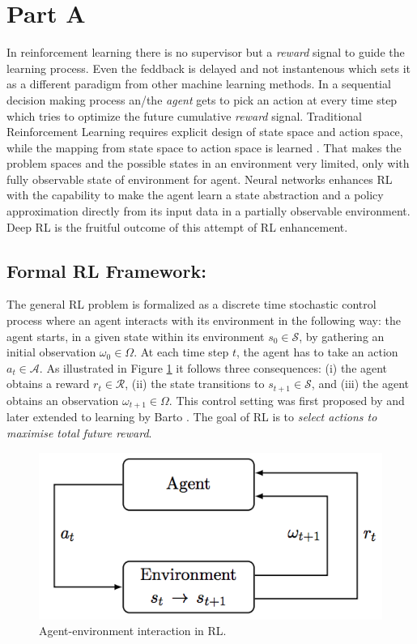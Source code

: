 \section{Part A}
\label{part_a}
In reinforcement learning there is no supervisor but a {\em reward} signal to guide the learning process. Even the feddback is delayed and not instantenous which sets it as a different paradigm from other machine learning methods. In a sequential decision making process an/the {\em agent} gets to pick an action at every time step which tries to optimize the future cumulative {\em reward} signal.
Traditional Reinforcement Learning
requires explicit design of state space and action space, while the mapping from state space to action space is learned \cite{sutton1998introduction}.
 That makes the problem spaces and the possible states in an environment very limited, only with fully observable state of environment for agent.  Neural networks enhances RL with the capability to make the agent learn a state abstraction and a policy approximation directly from its input data in a partially observable environment. Deep RL is the fruitful outcome of this attempt of RL enhancement.

\subsection{Formal RL Framework:}
\label{formal_rl}
The general RL problem is formalized as a discrete time stochastic
control process where an agent interacts with its environment in the
following way: the agent starts, in a given state within its environment
$s_0 \in \mathcal{S}$, by gathering an initial observation $\omega_0 \in \Omega$. At each time
step $t$, the agent has to take an action $a_t \in \mathcal{A}$. As illustrated in
Figure \ref{fig:rl_01} it follows three consequences: (i) the agent obtains a reward
$r_t \in \mathcal{R}$, (ii) the state transitions to $s_{t+1} \in \mathcal{S}$, and (iii) the agent obtains
an observation $\omega_{t+1} \in \Omega$. This control setting was first proposed by
\cite{bellman1957dynamic} and later extended to learning by Barto \cite{barto1983neuronlike}.
The goal of RL is to {\em select actions to maximise total future reward}.
\begin{figure}[t]
	\includegraphics[width=0.7\linewidth ]{fig/agent.png}
    \vspace{-2mm}
    \caption{Agent-environment interaction in RL.}
    \label{fig:rl_01}
\end{figure}

